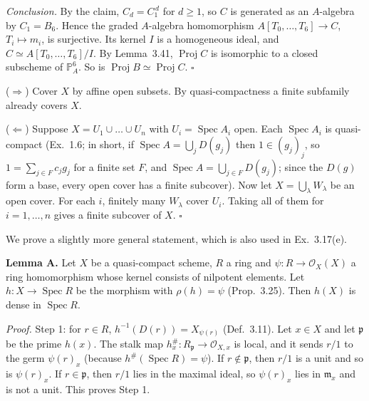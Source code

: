 \documentclass[11pt]{article}
\begin{document}
\emph{Conclusion.} By the claim, $C_d=C_1^{\,d}$ for $d\ge1$, so $C$ is generated as an $A$-algebra by $C_1=B_6$. Hence the graded $A$-algebra homomorphism $A[T_0,\dots,T_6]\to C$, $T_i\mapsto m_i$, is surjective. Its kernel $I$ is a homogeneous ideal, and $C\simeq A[T_0,\dots,T_6]/I$. By Lemma~3.41, $\operatorname{Proj}C$ is isomorphic to a closed subscheme of $\mathbb{P}^6_A$. So is $\operatorname{Proj}B\simeq\operatorname{Proj}C$. \hfill$\square$

\pf
($\Rightarrow$) Cover $X$ by affine open subsets. By quasi-compactness a finite subfamily already covers $X$.

($\Leftarrow$) Suppose $X=U_1\cup\dots\cup U_n$ with $U_i=\operatorname{Spec}A_i$ open. Each $\operatorname{Spec}A_i$ is quasi-compact (Ex.~1.6; in short, if $\operatorname{Spec}A=\bigcup_jD(g_j)$ then $1\in(g_j)_j$, so $1=\sum_{j\in F}c_jg_j$ for a finite set $F$, and $\operatorname{Spec}A=\bigcup_{j\in F}D(g_j)$; since the $D(g)$ form a base, every open cover has a finite subcover). Now let $X=\bigcup_{\lambda}W_\lambda$ be an open cover. For each $i$, finitely many $W_\lambda$ cover $U_i$. Taking all of them for $i=1,\dots,n$ gives a finite subcover of $X$. \hfill$\square$

\pf
We prove a slightly more general statement, which is also used in Ex.~3.17(e).

\textbf{Lemma A.} Let $X$ be a quasi-compact scheme, $R$ a ring and $\psi:R\to\mathcal{O}_X(X)$ a ring homomorphism whose kernel consists of nilpotent elements. Let $h:X\to\operatorname{Spec}R$ be the morphism with $\rho(h)=\psi$ (Prop.~3.25). Then $h(X)$ is dense in $\operatorname{Spec}R$.

\emph{Proof.} Step 1: for $r\in R$, $h^{-1}(D(r))=X_{\psi(r)}$ (Def.~3.11). Let $x\in X$ and let $\mathfrak p$ be the prime $h(x)$. The stalk map $h^\#_x:R_{\mathfrak p}\to\mathcal{O}_{X,x}$ is local, and it sends $r/1$ to the germ $\psi(r)_x$ (because $h^\#(\operatorname{Spec}R)=\psi$). If $r\notin\mathfrak p$, then $r/1$ is a unit and so is $\psi(r)_x$. If $r\in\mathfrak p$, then $r/1$ lies in the maximal ideal, so $\psi(r)_x$ lies in $\mathfrak m_x$ and is not a unit. This proves Step 1.
\end{document}
